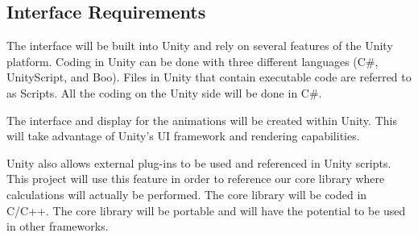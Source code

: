 \subsection{Interface Requirements}
	The interface will be built into Unity and rely on several features of the Unity platform.  
	Coding in Unity can be done with three different languages (C\#, UnityScript, and Boo).  Files in Unity that contain executable code are referred to as Scripts.  All the coding on the Unity side will be done in C\#. \par

	The interface and display for the animations will be created within Unity.  This will take advantage of Unity's UI framework and rendering capabilities. 
\par
	Unity also allows external plug-ins to be used and referenced in Unity scripts.  This project will use this feature in order to reference our core library where calculations will actually be performed.  The core library will be coded in C/C++.  The core library will be portable and will have the potential to be used in other frameworks. \par
